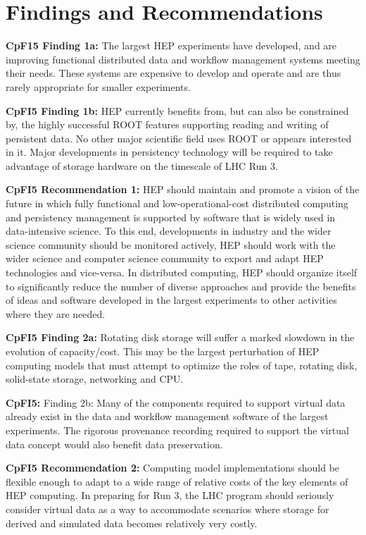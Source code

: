 \section{Findings and Recommendations}
\label{sec:cpfi5-findings}
{\bf CpF15 Finding 1a:} The largest HEP experiments have developed, and are 
improving functional distributed data and workflow management systems meeting 
their needs. These systems are expensive to develop and operate and are thus 
rarely appropriate for smaller experiments.

{\bf CpFI5 Finding 1b:} HEP currently benefits from, but can also be 
constrained by, the highly successful ROOT features supporting reading 
and writing of persistent data. No other major scientific field uses 
ROOT or appears interested in it. Major developments in persistency 
technology will be required to take advantage of storage hardware on the 
timescale of LHC Run 3.

{\bf CpFI5 Recommendation 1:} HEP should maintain and promote a vision of the future 
in which fully functional and low-operational-cost distributed computing and 
persistency management is supported by software that is widely used in 
data-intensive science.  To this end, developments in industry and the wider 
science community should be monitored actively, HEP should work with the wider 
science and computer science community to export and adapt HEP technologies and 
vice-versa. In distributed computing, HEP should organize itself to significantly 
reduce the number of diverse approaches and provide the benefits of ideas and 
software developed in the largest experiments to other activities where they are needed.

{\bf CpFI5 Finding 2a:} Rotating disk storage will suffer a marked slowdown in the 
evolution of capacity/cost.  This may be the largest perturbation of HEP computing 
models that must attempt to optimize the roles of tape, rotating disk, solid-state 
storage, networking and CPU.

{\bf CpFI5:} Finding 2b: Many of the components required to support virtual data 
already exist in the data and workflow management software of the largest experiments.  
The rigorous provenance recording required to support the virtual data concept would 
also benefit data preservation.

{\bf CpFI5 Recommendation 2:} Computing model implementations should be flexible 
enough to adapt to a wide range of relative costs of the key elements of HEP 
computing.  In preparing for Run 3, the LHC program should seriously consider 
virtual data as a way to accommodate scenarios where storage for derived and 
simulated data becomes relatively very costly.


